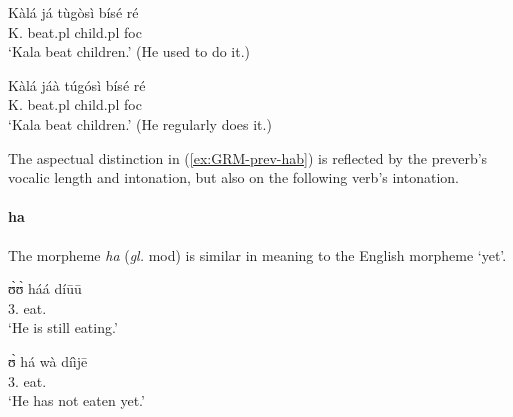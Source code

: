 \begin{exe}
\begin{exe}
\begin{exe}
{\begin{exe}
\begin{exe}
\begin{exe}
\begin{exe}
\begin{exe}
\begin{exe}
\begin{exe}
\begin{xlist}
\begin{exe}
\begin{exe}
\begin{exe}
\begin{exe}
\begin{exe}
\begin{exe}
\begin{exe}
\begin{exe}
\begin{exe}
\begin{exe}
\begin{exe}
\begin{exe}
\begin{exe}
\begin{exe}
\begin{exe}
 

\ea\label{ex:GRM-prev-hab}
\ea\label{ex:GRM-prev-hab-do-pfv}
\gll  Kàlá já tùgòsì bísé ré\\
 K.  {\hab}  beat.{\sc pl} child.{\sc pl} {\sc foc} \\
\glt `Kala beat children.' (He used to do it.)

\ex\label{ex:GRM-prev-hab-impv}
\gll  Kàlá jáà túgósì bísé ré\\
K.  {\hab}  beat.{\sc pl} child.{\sc pl} {\sc foc} \\
\glt `Kala beat children.' (He regularly does it.)

\z 
 \z

The aspectual distinction in (\ref{ex:GRM-prev-hab}) is reflected by the 
preverb's vocalic length and intonation, but also on the following verb's 
intonation.




\paragraph{ha}
\label{sec:GRM-preverb-yet}

The morpheme {\it ha} ({\it gl.} {\sc mod}) is similar in meaning to the 
English 
morpheme `yet'. 




\ea
\ea\label{ex:vp32.24}
\gll ʊ̀ʊ̀ háá díūū \\
     {3.\sg}  {\mod} eat.\foc  \\
\glt  `He is still eating.' 


\ex\label{ex:vp20.3.2.}
\gll ʊ̀ há wà díìjē \\
 {3.\sg}  {\mod} {\neg} eat.{\pfv}   \\
\glt  `He has not eaten yet.'



\end{exe}
\end{exe}
\end{exe}
\end{exe}
\end{exe}
\end{exe}
\end{exe}
\end{exe}
\end{exe}
\end{exe}
\end{exe}
\end{exe}
\end{exe}
\end{exe}
\end{exe}
\end{xlist}
\end{exe}
\end{exe}
\end{exe}
\end{exe}
\end{exe}
\end{exe}
\end{exe}}
\end{exe}
\end{exe}
\end{exe}
